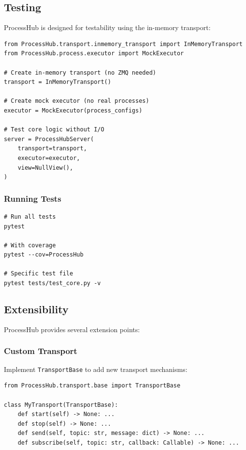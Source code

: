 \subsection{Testing}

ProcessHub is designed for testability using the in-memory transport:

\begin{verbatim}
from ProcessHub.transport.inmemory_transport import InMemoryTransport
from ProcessHub.process.executor import MockExecutor

# Create in-memory transport (no ZMQ needed)
transport = InMemoryTransport()

# Create mock executor (no real processes)
executor = MockExecutor(process_configs)

# Test core logic without I/O
server = ProcessHubServer(
    transport=transport,
    executor=executor,
    view=NullView(),
)
\end{verbatim}

\subsubsection{Running Tests}

\begin{verbatim}
# Run all tests
pytest

# With coverage
pytest --cov=ProcessHub

# Specific test file
pytest tests/test_core.py -v
\end{verbatim}

\subsection{Extensibility}

ProcessHub provides several extension points:

\subsubsection{Custom Transport}

Implement \texttt{TransportBase} to add new transport mechanisms:

\begin{verbatim}
from ProcessHub.transport.base import TransportBase

class MyTransport(TransportBase):
    def start(self) -> None: ...
    def stop(self) -> None: ...
    def send(self, topic: str, message: dict) -> None: ...
    def subscribe(self, topic: str, callback: Callable) -> None: ...
\end{verbatim}

